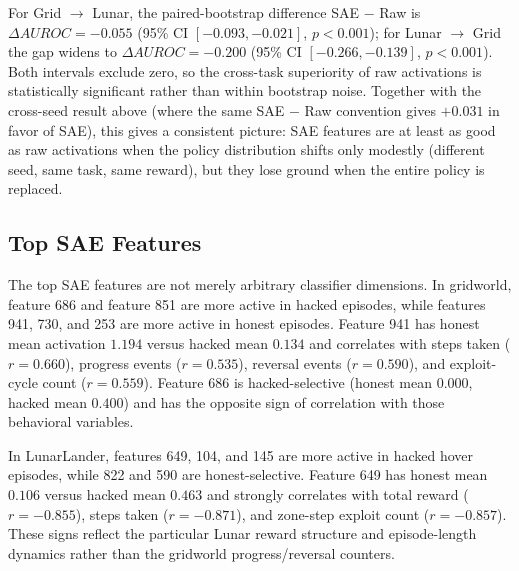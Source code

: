 \documentclass[11pt]{article}
\newcommand{\auroc}{AUROC}
\begin{document}
For Grid $\rightarrow$ Lunar, the paired-bootstrap difference SAE $-$ Raw is $\Delta\auroc{}=-0.055$ (95\% CI $[-0.093, -0.021]$, $p<0.001$); for Lunar $\rightarrow$ Grid the gap widens to $\Delta\auroc{}=-0.200$ (95\% CI $[-0.266, -0.139]$, $p<0.001$). Both intervals exclude zero, so the cross-task superiority of raw activations is statistically significant rather than within bootstrap noise. Together with the cross-seed result above (where the same SAE $-$ Raw convention gives $+0.031$ in favor of SAE), this gives a consistent picture: SAE features are at least as good as raw activations when the policy distribution shifts only modestly (different seed, same task, same reward), but they lose ground when the entire policy is replaced.

\subsection{Top SAE Features}
\label{sec:topfeatures}

The top SAE features are not merely arbitrary classifier dimensions. In gridworld, feature 686 and feature 851 are more active in hacked episodes, while features 941, 730, and 253 are more active in honest episodes. Feature 941 has honest mean activation $1.194$ versus hacked mean $0.134$ and correlates with steps taken ($r=0.660$), progress events ($r=0.535$), reversal events ($r=0.590$), and exploit-cycle count ($r=0.559$). Feature 686 is hacked-selective (honest mean $0.000$, hacked mean $0.400$) and has the opposite sign of correlation with those behavioral variables.

In LunarLander, features 649, 104, and 145 are more active in hacked hover episodes, while 822 and 590 are honest-selective. Feature 649 has honest mean $0.106$ versus hacked mean $0.463$ and strongly correlates with total reward ($r=-0.855$), steps taken ($r=-0.871$), and zone-step exploit count ($r=-0.857$). These signs reflect the particular Lunar reward structure and episode-length dynamics rather than the gridworld progress/reversal counters.
\end{document}
